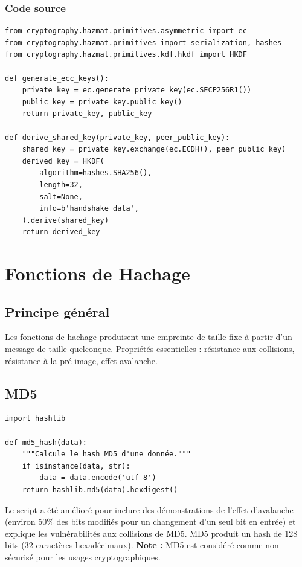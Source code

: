 \documentclass[12pt,a4paper]{report}
\begin{document}
\subsection{Code source}
\begin{lstlisting}[style=python,caption=ECC.py]
from cryptography.hazmat.primitives.asymmetric import ec
from cryptography.hazmat.primitives import serialization, hashes
from cryptography.hazmat.primitives.kdf.hkdf import HKDF

def generate_ecc_keys():
    private_key = ec.generate_private_key(ec.SECP256R1())
    public_key = private_key.public_key()
    return private_key, public_key

def derive_shared_key(private_key, peer_public_key):
    shared_key = private_key.exchange(ec.ECDH(), peer_public_key)
    derived_key = HKDF(
        algorithm=hashes.SHA256(),
        length=32,
        salt=None,
        info=b'handshake data',
    ).derive(shared_key)
    return derived_key
\end{lstlisting}

\chapter{Fonctions de Hachage}

\section{Principe général}
Les fonctions de hachage produisent une empreinte de taille fixe à partir d'un message de taille quelconque. Propriétés essentielles : résistance aux collisions, résistance à la pré-image, effet avalanche.

\section{MD5}
\begin{lstlisting}[style=python,caption=MD5.py - Calcul du Hash]
import hashlib

def md5_hash(data):
    """Calcule le hash MD5 d'une donnée."""
    if isinstance(data, str):
        data = data.encode('utf-8')
    return hashlib.md5(data).hexdigest()
\end{lstlisting}
Le script a été amélioré pour inclure des démonstrations de l'effet d'avalanche (environ 50\% des bits modifiés pour un changement d'un seul bit en entrée) et explique les vulnérabilités aux collisions de MD5.
MD5 produit un hash de 128 bits (32 caractères hexadécimaux). \textbf{Note :} MD5 est considéré comme non sécurisé pour les usages cryptographiques.
\end{document}
